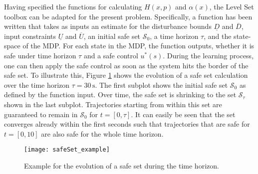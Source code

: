 \documentclass[../main.tex]{subfiles}
\begin{document}
Having specified the functions for calculating $H(x,p)$ and $\alpha(x)$, the Level Set toolbox can be adapted for the present problem. Specifically, a function has been written that takes as inputs an estimate for the disturbance bounds $\underline{D}$ and $\overline{D}$, input constraints $\underline{U}$ and $\overline{U}$, an initial safe set $\mathcal{S}_0$, a time horizon $\tau$, and the state-space of the MDP. For each state in the MDP, the function outputs, whether it is safe under time horizon $\tau$ and a safe control $u^*(s)$. During the learning process, one can then apply the safe control as soon as the system hits the border of the safe set. To illustrate this, Figure \ref{fig:safeSet_example} shows the evolution of a safe set calculation over the time horizon $\tau = 30\,\text{s}$. The first subplot shows the initial safe set $\mathcal{S}_0$ as defined by the function input. Over time, the safe set is shrinking to the set $\mathcal{S}_\tau$ shown in the last subplot. Trajectories starting from within this set are guaranteed to remain in $\mathcal{S}_0$ for $t = [0, \tau]$. It can easily be seen that the set converges already within the first seconds such that trajectories that are safe for $t = [0, 10]$ are also safe for the whole time horizon. 

\begin{figure}[H]
    \centering
    \texttt{[image: safeSet\_example]}
        \caption{Example for the evolution of a safe set during the time horizon.}    
    \label{fig:safeSet_example}
\end{figure}
\end{document}
